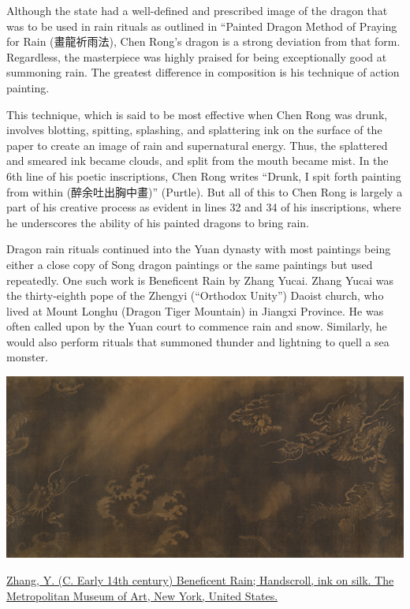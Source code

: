 \documentclass[
]{book}
\begin{document}
Although the state had a well-defined and prescribed image of the dragon that was to be used in rain rituals as outlined in ``Painted Dragon Method of Praying for Rain (畫龍祈雨法), Chen Rong's dragon is a strong deviation from that form. Regardless, the masterpiece was highly praised for being exceptionally good at summoning rain. The greatest difference in composition is his technique of action painting.

This technique, which is said to be most effective when Chen Rong was drunk, involves blotting, spitting, splashing, and splattering ink on the surface of the paper to create an image of rain and supernatural energy. Thus, the splattered and smeared ink became clouds, and split from the mouth became mist. In the 6th line of his poetic inscriptions, Chen Rong writes ``Drunk, I spit forth painting from within (醉余吐出胸中畫)'' (Purtle). But all of this to Chen Rong is largely a part of his creative process as evident in lines 32 and 34 of his inscriptions, where he underscores the ability of his painted dragons to bring rain.

Dragon rain rituals continued into the Yuan dynasty with most paintings being either a close copy of Song dragon paintings or the same paintings but used repeatedly. One such work is Beneficent Rain by Zhang Yucai. Zhang Yucai was the thirty-eighth pope of the Zhengyi (``Orthodox Unity'') Daoist church, who lived at Mount Longhu (Dragon Tiger Mountain) in Jiangxi Province. He was often called upon by the Yuan court to commence rain and snow. Similarly, he would also perform rituals that summoned thunder and lightning to quell a sea monster.

\includegraphics[width=1.2\textwidth,height=\textheight]{images/beneficent_Rain.png}

\href{https://www.metmuseum.org/art/collection/search/40454}{Zhang, Y. (C. Early 14th century) Beneficent Rain; Handscroll, ink on silk. The Metropolitan Museum of Art, New York, United States.}
\end{document}
